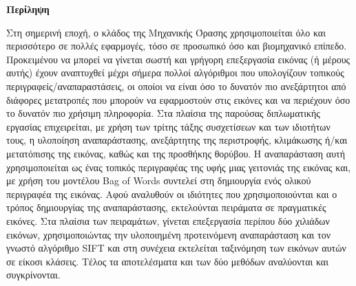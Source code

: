 \vspace{0.5cm}
\textbf{\Large{Περίληψη}}

\vspace{1cm}

Στη σημερινή εποχή, ο κλάδος της Μηχανικής Όρασης χρησιμοποιείται όλο και περισσότερο σε πολλές εφαρμογές, τόσο σε προσωπικό όσο και βιομηχανικό επίπεδο. Προκειμένου να μπορεί να γίνεται σωστή και γρήγορη επεξεργασία εικόνας (ή μέρους αυτής) έχουν αναπτυχθεί μέχρι σήμερα πολλοί αλγόριθμοι που υπολογίζουν τοπικούς περιγραφείς/αναπαραστάσεις, οι οποίοι να είναι όσο το δυνατόν πιο ανεξάρτητοι από διάφορες μετατροπές που μπορούν να εφαρμοστούν στις εικόνες και να περιέχουν όσο το δυνατόν πιο χρήσιμη πληροφορία. Στα πλαίσια της παρούσας διπλωματικής εργασίας επιχειρείται, με χρήση των τρίτης τάξης συσχετίσεων και των ιδιοτήτων τους, η υλοποίηση αναπαράστασης, ανεξάρτητης της περιστροφής, κλιμάκωσης ή/και μετατόπισης της εικόνας, καθώς και της προσθήκης θορύβου. Η αναπαράσταση αυτή χρησιμοποιείται ως ένας τοπικός περιγραφέας της υφής μιας γειτονιάς της εικόνας και, με χρήση του μοντέλου Bag of Words συντελεί στη δημιουργία ενός ολικού περιγραφέα της εικόνας. Αφού αναλυθούν οι ιδιότητες που χρησιμοποιούνται και ο τρόπος δημιουργίας της αναπαράστασης, εκτελούνται πειράματα σε πραγματικές εικόνες. Στα πλαίσια των πειραμάτων, γίνεται επεξεργασία περίπου δύο χιλιάδων εικόνων, χρησιμοποιώντας την υλοποιημένη προτεινόμενη αναπαράσταση και τον γνωστό αλγόριθμο SIFT και στη συνέχεια εκτελείται ταξινόμηση των εικόνων αυτών σε είκοσι κλάσεις. Τέλος τα αποτελέσματα και των δύο μεθόδων αναλύονται και συγκρίνονται.

